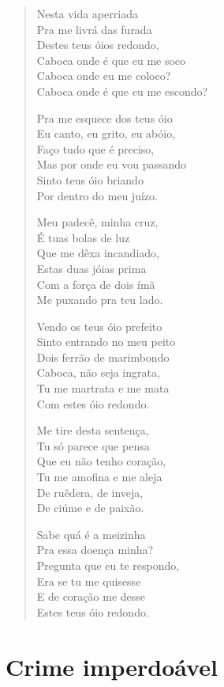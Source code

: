 \begin{verse}
Nesta vida aperriada\\
Pra me livrá das furada\\
Destes teus óios redondo,\\
Caboca onde é que eu me soco\\
Caboca onde eu me coloco?\\
Caboca onde é que eu me escondo?

Pra me esquece dos teus óio\\
Eu canto, eu grito, eu abóio,\\
Faço tudo que é preciso,\\
Mas por onde eu vou passando\\
Sinto teus óio briando\\
Por dentro do meu juízo.

Meu padecê, minha cruz,\\
É tuas bolas de luz\\
Que me dêxa incandiado,\\
Estas duas jóias prima\\
Com a força de dois ímã\\
Me puxando pra teu lado.

Vendo os teus óio prefeito\\
Sinto entrando no meu peito\\
Dois ferrão de marimbondo\\
Caboca, não seja ingrata,\\
Tu me martrata e me mata\\
Com estes óio redondo.

Me tire desta sentença,\\
Tu só parece que pensa\\
Que eu não tenho coração,\\
Tu me amofina e me aleja\\
De ruêdera, de inveja,\\
De ciúme e de paixão.

Sabe quá é a meizinha\\
Pra essa doença minha?\\
Pregunta que eu te respondo,\\
Era se tu me quisesse\\
E de coração me desse\\
Estes teus óio redondo.
\end{verse}

\chapter{Crime imperdoável}

